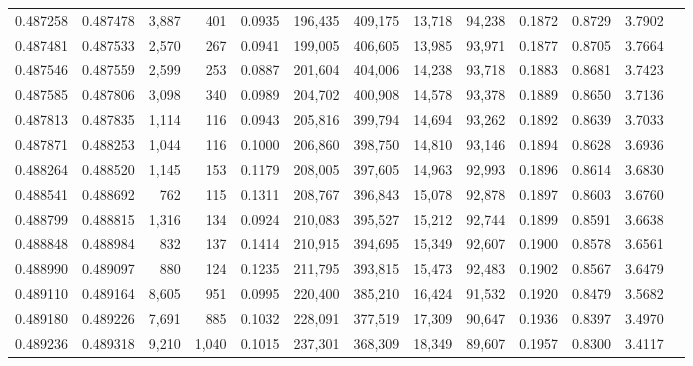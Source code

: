 \begin{tabular}{rrrrrrrrrrrrr}
0.487258 & 0.487478 & 3,887 &   401 &                                     0.0935 & 196,435 & 409,175 &  13,718 &  94,238 & 0.1872 & 0.8729 & 3.7902 \\
0.487481 & 0.487533 & 2,570 &   267 &                                     0.0941 & 199,005 & 406,605 &  13,985 &  93,971 & 0.1877 & 0.8705 & 3.7664 \\
0.487546 & 0.487559 & 2,599 &   253 &                                     0.0887 & 201,604 & 404,006 &  14,238 &  93,718 & 0.1883 & 0.8681 & 3.7423 \\
0.487585 & 0.487806 & 3,098 &   340 &                                     0.0989 & 204,702 & 400,908 &  14,578 &  93,378 & 0.1889 & 0.8650 & 3.7136 \\
0.487813 & 0.487835 & 1,114 &   116 &                                     0.0943 & 205,816 & 399,794 &  14,694 &  93,262 & 0.1892 & 0.8639 & 3.7033 \\
0.487871 & 0.488253 & 1,044 &   116 &                                     0.1000 & 206,860 & 398,750 &  14,810 &  93,146 & 0.1894 & 0.8628 & 3.6936 \\
0.488264 & 0.488520 & 1,145 &   153 &                                     0.1179 & 208,005 & 397,605 &  14,963 &  92,993 & 0.1896 & 0.8614 & 3.6830 \\
0.488541 & 0.488692 &   762 &   115 &                                     0.1311 & 208,767 & 396,843 &  15,078 &  92,878 & 0.1897 & 0.8603 & 3.6760 \\
0.488799 & 0.488815 & 1,316 &   134 &                                     0.0924 & 210,083 & 395,527 &  15,212 &  92,744 & 0.1899 & 0.8591 & 3.6638 \\
0.488848 & 0.488984 &   832 &   137 &                                     0.1414 & 210,915 & 394,695 &  15,349 &  92,607 & 0.1900 & 0.8578 & 3.6561 \\
0.488990 & 0.489097 &   880 &   124 &                                     0.1235 & 211,795 & 393,815 &  15,473 &  92,483 & 0.1902 & 0.8567 & 3.6479 \\
0.489110 & 0.489164 & 8,605 &   951 &                                     0.0995 & 220,400 & 385,210 &  16,424 &  91,532 & 0.1920 & 0.8479 & 3.5682 \\
0.489180 & 0.489226 & 7,691 &   885 &                                     0.1032 & 228,091 & 377,519 &  17,309 &  90,647 & 0.1936 & 0.8397 & 3.4970 \\
0.489236 & 0.489318 & 9,210 & 1,040 &                                     0.1015 & 237,301 & 368,309 &  18,349 &  89,607 & 0.1957 & 0.8300 & 3.4117 \\

\end{tabular}
